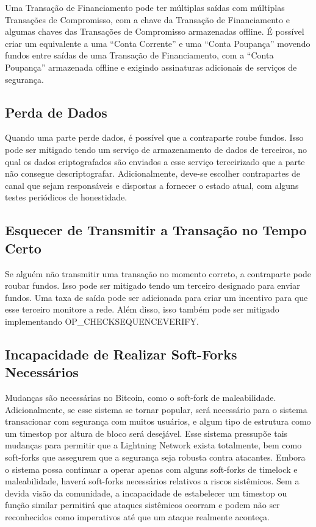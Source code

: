 \documentclass[letterpaper,11pt]{article}
\begin{document}
Uma Transação de Financiamento pode ter múltiplas saídas com múltiplas
Transações de Compromisso, com a chave da Transação de Financiamento e
algumas chaves das Transações de Compromisso armazenadas offline. É
possível criar um equivalente a uma ``Conta Corrente'' e uma ``Conta
Poupança'' movendo fundos entre saídas de uma Transação de Financiamento,
com a ``Conta Poupança'' armazenada offline e exigindo assinaturas
adicionais de serviços de segurança.

\subsection{Perda de Dados}

Quando uma parte perde dados, é possível que a contraparte roube fundos.
Isso pode ser mitigado tendo um serviço de armazenamento de dados de
terceiros, no qual os dados criptografados são enviados a esse serviço
terceirizado que a parte não consegue descriptografar. Adicionalmente,
deve-se escolher contrapartes de canal que sejam responsáveis e dispostas a
fornecer o estado atual, com alguns testes periódicos de honestidade.

\subsection{Esquecer de Transmitir a Transação no Tempo Certo}

Se alguém não transmitir uma transação no momento correto, a contraparte
pode roubar fundos. Isso pode ser mitigado tendo um terceiro designado
para enviar fundos. Uma taxa de saída pode ser adicionada para criar um
incentivo para que esse terceiro monitore a rede. Além disso, isso também
pode ser mitigado implementando OP\_CHECKSEQUENCEVERIFY.

\subsection{Incapacidade de Realizar Soft-Forks Necessários}

Mudanças são necessárias no Bitcoin, como o soft-fork de maleabilidade.
Adicionalmente, se esse sistema se tornar popular, será necessário para o
sistema transacionar com segurança com muitos usuários, e algum tipo de
estrutura como um timestop por altura de bloco será desejável. Esse
sistema pressupõe tais mudanças para permitir que a Lightning Network
exista totalmente, bem como soft-forks que assegurem que a segurança seja
robusta contra atacantes. Embora o sistema possa continuar a operar
apenas com alguns soft-forks de timelock e maleabilidade, haverá
soft-forks necessários relativos a riscos sistêmicos. Sem a devida visão
da comunidade, a incapacidade de estabelecer um timestop ou função
similar permitirá que ataques sistêmicos ocorram e podem não ser
reconhecidos como imperativos até que um ataque realmente aconteça.
\end{document}
